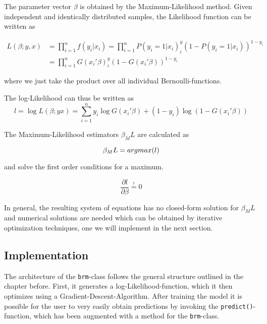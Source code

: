 \documentclass{article}
\begin{document}
The parameter vector $\beta$ is obtained by the Maximum-Likelihood method. Given independent and identically distributed samples, the Likelihood function can be written as

\begin{equation}
\begin{split}
L(\beta;y, x) &= \prod_{i=1}^{n} f(y_i | x_i)
              =\prod_{i=1}^{n} P(y_i=1|x_i)^y_i\left(1-P(y_i=1|x_i)\right)^{1-y_i} \\
            & =\prod_{i=1}^{n} G(x_i\prime \beta)^y_i\left(1-G(x_i\prime \beta)\right)^{1-y_i}
\end{split}
\end{equation}

where we just take the product over all individual Bernoulli-functions.

The log-Likelihood can thus be written as
\begin{equation}
\label{logL}
l = \log L(\beta;y x) = \sum_{i=1}^{n} y_i \log G(x_i\prime \beta) +(1-y_i) \log (1-G(x_i\prime \beta))
\end{equation}

The Maximum-Likelihood estimators $\beta_ML$ are calculated as

\begin{equation}
\beta_ML = argmax(l) \\
\end{equation}

and solve the first order conditions for a maximum.

\begin{equation}
\frac{\partial l}{\partial \beta} \stackrel{!}{=} 0
\end{equation}

In general, the resulting system of equations has no closed-form solution for $\beta_ML$ and numerical solutions are needed which can be obtained by iterative optimization techniques, one we will implement in the next section.\cite{winkel09}

\subsection{Implementation}

The architecture of the \texttt{brm}-class follows the general structure outlined in the chapter before. First, it generates a log-Likelihood-function, which it then optimizes using a Gradient-Descent-Algorithm. After training the model it is possible for the user to very easily obtain predictions by invoking the \texttt{predict()}-function, which has been augmented with a method for the \texttt{brm}-class.
\end{document}
